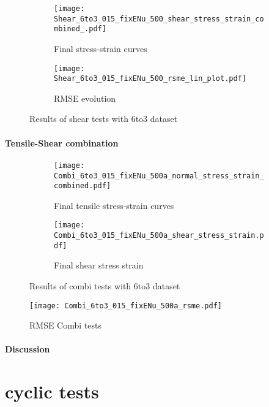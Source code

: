 \begin{figure}[H]
\centering
\begin{subfigure}[t]{0.495\textwidth}
    \centering
     \texttt{[image: Shear\_6to3\_015\_fixENu\_500\_shear\_stress\_strain\_combined\_.pdf]}
        \caption{Final stress-strain curves}
        \label{subfig:shearStressStrain6to3}
\end{subfigure}
\hfill
\begin{subfigure}[t]{0.495\textwidth}
    \centering
    \texttt{[image: Shear\_6to3\_015\_fixENu\_500\_rsme\_lin\_plot.pdf]}
        \caption{ RMSE evolution}
        \label{subfig:shearRMSE}
\end{subfigure}
\caption{Results of shear tests with 6to3 dataset}
\label{fig:shearResults6to3}
\end{figure}

\paragraph{Tensile-Shear combination}

\begin{figure}[H]
\centering
\begin{subfigure}[t]{0.495\textwidth}
    \centering
    \texttt{[image: Combi\_6to3\_015\_fixENu\_500a\_normal\_stress\_strain\_combined.pdf]}
    \caption{Final tensile stress-strain curves}
    \label{subfig:CombiTensileStressStrainCurve}
\end{subfigure}
\hfill
\begin{subfigure}[t]{0.495\textwidth}
    \centering
    \texttt{[image: Combi\_6to3\_015\_fixENu\_500a\_shear\_stress\_strain.pdf]}
    \caption{Final shear stress strain}
    \label{subfig:CombiShearStressStrain}
\end{subfigure}
\caption{Results of combi tests with 6to3 dataset}
\label{fig:CombiResults6to3}
\end{figure}

\begin{figure}[H]
    \centering
    \texttt{[image: Combi\_6to3\_015\_fixENu\_500a\_rsme.pdf]}
    \caption{RMSE Combi tests}
    \label{fig:combiRMSE}
\end{figure}

\paragraph{Discussion}





\section{cyclic tests}







